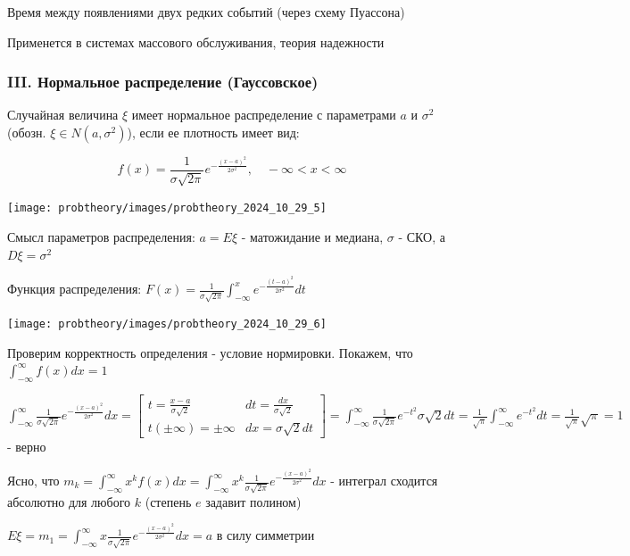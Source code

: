 \documentclass[12pt]{article}
\begin{document}
     Время между появлениями двух редких событий (через схему Пуассона)

    \Notas Применется в системах массового обслуживания, теория надежности

    \hypertarget{normaldistribution}{}

    \subsubsection{III. Нормальное распределение (Гауссовское)}

    \Def Случайная величина $\xi$ имеет нормальное распределение с параметрами $a$ и $\sigma^2$ (обозн. $\xi \in N(a, \sigma^2)$), если
    ее плотность имеет вид:

    \[f(x) = \frac{1}{\sigma \sqrt{2\pi}} e^{-\frac{(x - a)^2}{2\sigma^2}}, \quad -\infty < x < \infty\]

    \texttt{[image: probtheory/images/probtheory\_2024\_10\_29\_5]}

    Смысл параметров распределения: $a = E\xi$ - матожидание и медиана, $\sigma$ - СКО, а $D\xi = \sigma^2$

    Функция распределения: $F(x) = \frac{1}{\sigma \sqrt{2\pi}} \int_{-\infty}^x e^{-\frac{(t - a)^2}{2\sigma^2}} dt$

    \texttt{[image: probtheory/images/probtheory\_2024\_10\_29\_6]}

    Проверим корректность определения - условие нормировки. Покажем, что $\int_{-\infty}^\infty f(x)dx = 1$

    $\int_{-\infty}^\infty \frac{1}{\sigma \sqrt{2\pi}} e^{-\frac{(x - a)^2}{2\sigma^2}} dx = \left[\begin{matrix}t = \frac{x - a}{\sigma \sqrt{2}} & dt = \frac{dx}{\sigma\sqrt{2}} \\ t (\pm \infty) = \pm \infty & dx = \sigma\sqrt{2}dt\end{matrix}\right] = 
    \int_{-\infty}^\infty \frac{1}{\sigma\sqrt{2\pi}} e^{-t^2} \sigma\sqrt{2} dt = \frac{1}{\sqrt{\pi}} \int_{-\infty}^{\infty} e^{-t^2} dt = \frac{1}{\sqrt{\pi}} \sqrt{\pi} = 1$ - верно

    Ясно, что $m_k = \int_{-\infty}^\infty x^k f(x) dx = \int_{-\infty}^\infty x^k \frac{1}{\sigma \sqrt{2\pi}} e^{-\frac{(x - a)^2}{2\sigma^2}} dx$ - интеграл сходится абсолютно для любого $k$ (степень $e$ задавит полином)

    $E\xi = m_1 = \int_{-\infty}^\infty x \frac{1}{\sigma \sqrt{2\pi}} e^{-\frac{(x - a)^2}{2\sigma^2}} dx = a$ в силу симметрии
\end{document}
